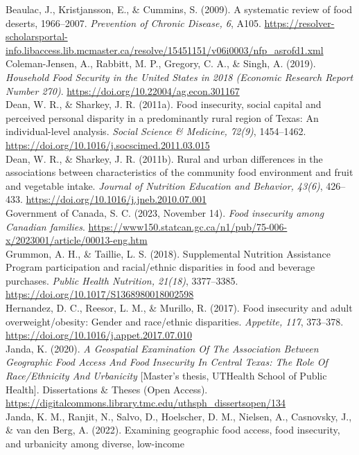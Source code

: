 \documentclass[]{article}
\begin{document}
Beaulac, J., Kristjansson, E., \& Cummins, S. (2009). A systematic
review of food deserts, 1966--2007. \emph{Prevention of Chronic Disease,
6}, A105.
\url{https://resolver-scholarsportal-info.libaccess.lib.mcmaster.ca/resolve/15451151/v06i0003/nfp_asrofd1.xml}\\
Coleman-Jensen, A., Rabbitt, M. P., Gregory, C. A., \& Singh, A. (2019).
\emph{Household Food Security in the United States in 2018 (Economic
Research Report Number 270)}.
\url{https://doi.org/10.22004/ag.econ.301167}\\
Dean, W. R., \& Sharkey, J. R. (2011a). Food insecurity, social capital
and perceived personal disparity in a predominantly rural region of
Texas: An individual-level analysis. \emph{Social Science \& Medicine,
72(9)}, 1454--1462.
\url{https://doi.org/10.1016/j.socscimed.2011.03.015}\\
Dean, W. R., \& Sharkey, J. R. (2011b). Rural and urban differences in
the associations between characteristics of the community food
environment and fruit and vegetable intake. \emph{Journal of Nutrition
Education and Behavior, 43(6)}, 426--433.
\url{https://doi.org/10.1016/j.jneb.2010.07.001}\\
Government of Canada, S. C. (2023, November 14). \emph{Food insecurity
among Canadian families}.
\url{https://www150.statcan.gc.ca/n1/pub/75-006-x/2023001/article/00013-eng.htm}\\
Grummon, A. H., \& Taillie, L. S. (2018). Supplemental Nutrition
Assistance Program participation and racial/ethnic disparities in food
and beverage purchases. \emph{Public Health Nutrition, 21(18)},
3377--3385. \url{https://doi.org/10.1017/S1368980018002598}\\
Hernandez, D. C., Reesor, L. M., \& Murillo, R. (2017). Food insecurity
and adult overweight/obesity: Gender and race/ethnic disparities.
\emph{Appetite, 117}, 373--378.
\url{https://doi.org/10.1016/j.appet.2017.07.010}\\
Janda, K. (2020). \emph{A Geospatial Examination Of The Association
Between Geographic Food Access And Food Insecurity In Central Texas: The
Role Of Race/Ethnicity And Urbanicity} {[}Master's thesis, UTHealth
School of Public Health{]}. Dissertations \& Theses (Open Access).
\url{https://digitalcommons.library.tmc.edu/uthsph_dissertsopen/134}\\
Janda, K. M., Ranjit, N., Salvo, D., Hoelscher, D. M., Nielsen, A.,
Casnovsky, J., \& van den Berg, A. (2022). Examining geographic food
access, food insecurity, and urbanicity among diverse, low-income
\end{document}
